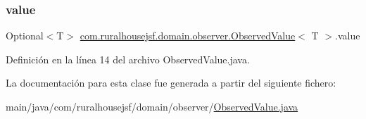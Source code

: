 \subsubsection{\texorpdfstring{value}{value}}
{\footnotesize\ttfamily Optional$<$T$>$ \mbox{\hyperlink{classcom_1_1ruralhousejsf_1_1domain_1_1observer_1_1_observed_value}{com.\+ruralhousejsf.\+domain.\+observer.\+Observed\+Value}}$<$ T $>$.value\hspace{0.3cm}{\ttfamily [private]}}



Definición en la línea 14 del archivo Observed\+Value.\+java.



La documentación para esta clase fue generada a partir del siguiente fichero\+:\begin{DoxyCompactItemize}
\item 
main/java/com/ruralhousejsf/domain/observer/\mbox{\hyperlink{_observed_value_8java}{Observed\+Value.\+java}}\end{DoxyCompactItemize}
